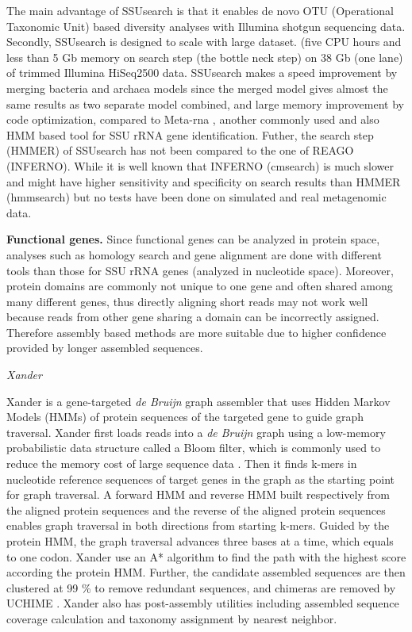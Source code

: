 \documentclass[]{msu-thesis}
\begin{document}
The main advantage of SSUsearch is that it enables de novo OTU
(Operational Taxonomic Unit) based diversity analyses with Illumina
shotgun sequencing data. Secondly, SSUsearch is designed to scale with
large dataset. (five CPU hours and less than 5 Gb memory on search step
(the bottle neck step) on 38 Gb (one lane) of trimmed Illumina HiSeq2500
data. SSUsearch makes a speed improvement by merging bacteria and
archaea models since the merged model gives almost the same results as
two separate model combined, and large memory improvement by code
optimization, compared to Meta-rna \cite{huang_identification_2009},
another commonly used and also HMM based tool for SSU rRNA gene
identification. Futher, the search step (HMMER) of SSUsearch has not
been compared to the one of REAGO (INFERNO). While it is well known that
INFERNO (cmsearch) is much slower and might have higher sensitivity and
specificity on search results than HMMER (hmmsearch) but no tests have
been done on simulated and real metagenomic data.

\textbf{Functional genes.}  Since functional genes can be analyzed in
protein space, analyses such as homology search and gene alignment are
done with different tools than those for SSU rRNA genes (analyzed in
nucleotide space). Moreover, protein domains are commonly not unique to
one gene and often shared among many different genes, thus directly
aligning short reads may not work well because reads from other gene
sharing a domain can be incorrectly assigned. Therefore assembly based
methods are more suitable due to higher confidence provided by longer
assembled sequences.

\textit{Xander}

Xander is a gene-targeted \textit{de Bruijn} graph assembler that uses
Hidden Markov Models
(HMMs) of protein sequences of the targeted gene to guide graph traversal.
Xander first
loads reads into a \textit{de Bruijn} graph using a low-memory probabilistic data
structure called a Bloom filter, which is commonly used to reduce the
memory cost of large sequence data \cite{pell_scaling_2012}. Then it
finds k-mers in nucleotide reference sequences of target genes in the
graph as the starting point for graph traversal. A forward HMM and
reverse HMM built respectively from the aligned protein sequences and the reverse
of the aligned protein sequences enables graph
traversal in both directions from starting k-mers. Guided by the
protein HMM, the graph traversal advances three bases at a
time, which equals to one codon. Xander use an A* algorithm to find the
path with the highest score according the protein HMM. Further, the
candidate assembled sequences are then clustered at 99 \% to remove
redundant sequences, and chimeras are removed by UCHIME
\cite{edgar_uchime_2011}. Xander also has post-assembly utilities
including assembled sequence coverage calculation and taxonomy assignment
by nearest neighbor.
\end{document}
